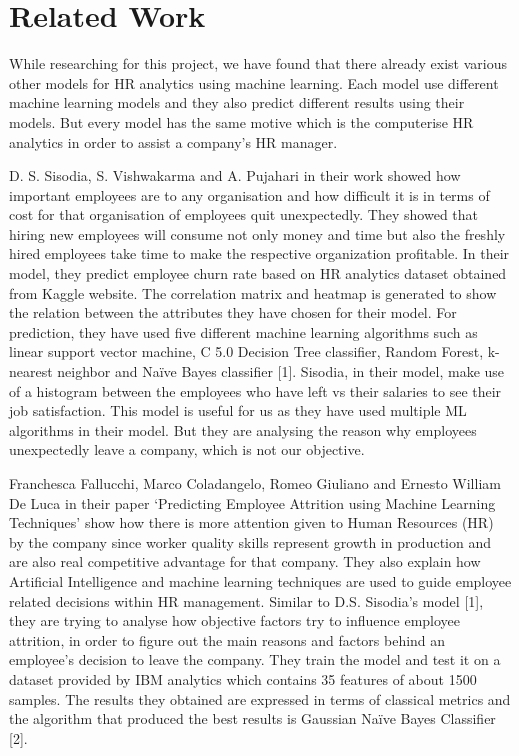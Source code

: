 \documentclass[11pt,conference]{IEEEtran}
\begin{document}
\section{Related Work}
While researching for this project, we have found that there already exist various other models for HR analytics using machine learning. Each model use different machine learning models and they also predict different results using their models. But every model has the same motive which is the computerise HR analytics in order to assist a company’s HR manager.\par
D. S. Sisodia, S. Vishwakarma and A. Pujahari in their work showed how important employees are to any organisation and how difficult it is in terms of cost for that organisation of employees quit unexpectedly. They showed that hiring new employees will consume not only money and time but also the freshly hired employees take time to make the respective organization profitable. In their model, they predict employee churn rate based on HR analytics dataset obtained from Kaggle website. The correlation matrix and heatmap is generated to show the relation between the attributes they have chosen for their model. For prediction, they have used five different machine learning algorithms such as linear support vector machine, C 5.0 Decision Tree classifier, Random Forest, k-nearest neighbor and Naïve Bayes classifier [1]. Sisodia, in their model, make use of a histogram between the employees who have left vs their salaries to see their job satisfaction. This model is useful for us as they have used multiple ML algorithms in their model. But they are analysing the reason why employees unexpectedly leave a company, which is not our objective.\par
Franchesca Fallucchi, Marco Coladangelo, Romeo Giuliano and Ernesto William De Luca in their paper ‘Predicting Employee Attrition using Machine Learning 	Techniques’ show how there is more attention given to Human Resources (HR) by the company since worker quality skills represent growth in production and are also real competitive advantage for that company. They also explain how Artificial Intelligence and machine learning techniques are used to guide employee related decisions within HR management. Similar to D.S. Sisodia’s model [1], they are trying to analyse how objective factors try to influence employee attrition, in order to figure out the main reasons and factors behind an employee’s decision to leave the company. They train the model and test it on a dataset provided by IBM analytics which contains 35 features of about 1500 samples. The results they obtained are expressed in terms of classical metrics and the algorithm that produced the best results is Gaussian Naïve Bayes Classifier [2].\par
\end{document}
